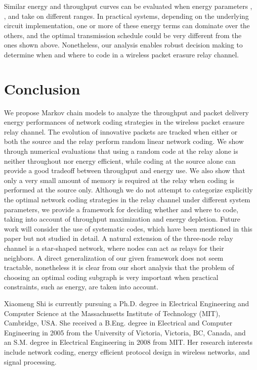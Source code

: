 \documentclass[journal, letterpaper]{IEEEtran}
\begin{document}
\begin{itemize}
Similar energy and throughput curves can be evaluated when energy parameters , ,  and  take on different ranges. In practical systems, depending on the underlying circuit implementation, one or more of these energy terms can dominate over the others, and the optimal transmission schedule could be very different from the ones shown above. Nonetheless, our analysis enables robust decision making to determine when and where to code in a wireless packet erasure relay channel.


\section{Conclusion}\label{sec:conclusion}
We propose Markov chain models to analyze the throughput and packet delivery energy performances of network coding strategies in the wireless packet erasure relay channel. The evolution of innovative packets are tracked when either or both the source and the relay perform random linear network coding. We show through numerical evaluations that using a random code at the relay alone is neither throughout nor energy efficient, while coding at the source alone can provide a good tradeoff between throughput and energy use. We also show that only a very small amount of memory is required at the relay when coding is performed at the source only. Although we do not attempt to categorize explicitly the optimal network coding strategies in the relay channel under different system parameters, we provide a framework for deciding whether and where to code, taking into account of throughput maximization and energy depletion. Future work will consider the use of systematic codes, which have been mentioned in this paper but not studied in detail. A natural extension of the three-node relay channel is a star-shaped network, where nodes can  act as relays for their neighbors. A direct generalization of our given framework does not seem tractable, nonetheless it is clear from our short analysis that the problem of choosing an optimal coding subgraph is very important when practical constraints, such as energy, are taken into account.







\begin{IEEEbiography}
{Xiaomeng Shi}
is currently pursuing a Ph.D. degree in Electrical Engineering and Computer Science at the Massachusetts Institute of Technology (MIT), Cambridge, USA. She received a B.Eng. degree in Electrical and Computer Engineering in 2005 from the University of Victoria, Victoria, BC, Canada, and an S.M. degree in Electrical Engineering in 2008 from MIT. Her research interests include network coding, energy efficient protocol design in wireless networks, and signal processing.
\end{IEEEbiography}


\end{itemize}
\end{document}
